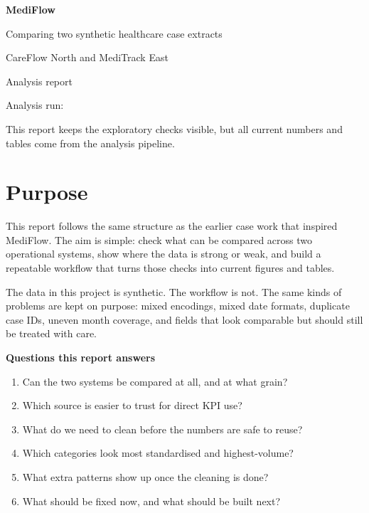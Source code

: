 \documentclass[11pt,a4paper]{article}
\begin{document}
\begin{titlepage}
\centering
\vspace*{3.2cm}
{\Huge\bfseries\color{navy} MediFlow\par}
\vspace{0.7cm}
{\Large Comparing two synthetic healthcare case extracts\par}
\vspace{0.35cm}
{\large CareFlow North and MediTrack East\par}
\vspace{1.8cm}
{\large Analysis report\par}
\vspace{0.35cm}
{\small Analysis run: \MediFlowAnalysisRunLabel\par}
\vfill
{\small This report keeps the exploratory checks visible, but all current numbers and tables come from the analysis pipeline.\par}
\end{titlepage}

\section{Purpose}

This report follows the same structure as the earlier case work that inspired MediFlow. The aim is simple: check what can be compared across two operational systems, show where the data is strong or weak, and build a repeatable workflow that turns those checks into current figures and tables.

The data in this project is synthetic. The workflow is not. The same kinds of problems are kept on purpose: mixed encodings, mixed date formats, duplicate case IDs, uneven month coverage, and fields that look comparable but should still be treated with care.

\begin{notebox}
\textbf{Questions this report answers}
\begin{enumerate}[leftmargin=*, label=\arabic*.]
  \item Can the two systems be compared at all, and at what grain?
  \item Which source is easier to trust for direct KPI use?
  \item What do we need to clean before the numbers are safe to reuse?
  \item Which categories look most standardised and highest-volume?
  \item What extra patterns show up once the cleaning is done?
  \item What should be fixed now, and what should be built next?
\end{enumerate}
\end{notebox}
\end{document}
